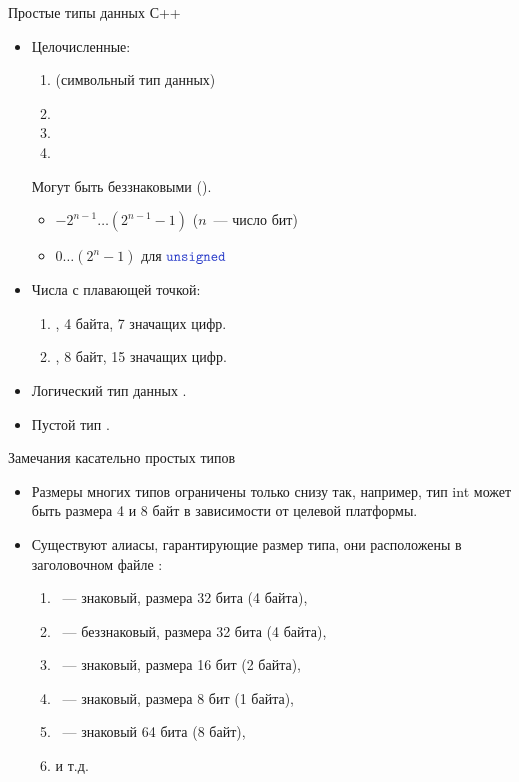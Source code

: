 \documentclass[aspectration=1610,t]{beamer}
\begin{document}
\begin{frame}[fragile]{Простые типы данных С++}
    \begin{itemize}
        \item Целочисленные:
            \begin{enumerate}
                \item {} (символьный тип данных)
                \item {}
                \item {}
                \item {}
            \end{enumerate}
        Могут быть беззнаковыми ().
        \begin{itemize}
            \item $-2^{n-1}\ldots (2^{n-1} - 1)$ ($n$~--- число бит)
            \item $0\ldots (2^{n} - 1)$ для $\code{unsigned}$
        \end{itemize}

        \item Числа с плавающей точкой:
            \begin{enumerate}
                \item {}, 4 байта, 7 значащих цифр.
                \item {}, 8 байт, 15 значащих цифр.
            \end{enumerate}
        \item Логический тип данных .

        \item Пустой тип .
    \end{itemize}
\end{frame}

\begin{frame}[fragile]{Замечания касательно простых типов}
    \begin{itemize}
        \item Размеры многих типов ограничены только снизу так, 
            например, тип int может быть размера 4 и 8 байт в зависимости от целевой платформы.
        \item Существуют алиасы, гарантирующие размер типа,
        они расположены в заголовочном файле :
            \begin{enumerate}
                \item {}~--- знаковый, размера 32 бита (4 байта),
                \item {}~--- беззнаковый, размера 32 бита (4 байта),
                \item {}~--- знаковый, размера 16 бит (2 байта),
                \item {}~--- знаковый, размера 8 бит (1 байта),
                \item {}~--- знаковый 64 бита (8 байт), 
                \item и т.д.
            \end{enumerate}
    \end{itemize}
\end{frame}
\end{document}
